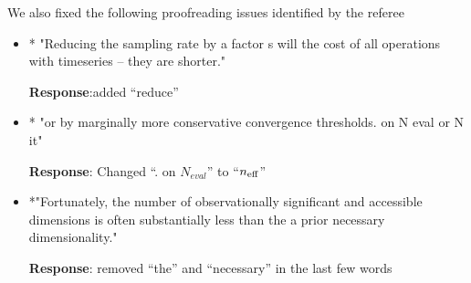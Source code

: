 \documentclass[onecolumn]{revtex4}
\begin{document}
We also fixed the following proofreading issues identified by the referee
\begin{itemize}


\item * "Reducing the sampling rate by a factor s will the cost of all
operations with timeseries – they are shorter."



\noindent \textbf{Response}:added ``reduce''


\item * "or by marginally more conservative convergence thresholds. on N
eval or N it"

\noindent \textbf{Response}: Changed ``. on $N_{eval}$'' to ``$n_{\rm eff}$''

\item *"Fortunately, the number of observationally significant and
accessible dimensions is often substantially less than the a prior
necessary dimensionality."

\noindent \textbf{Response}: removed ``the'' and ``necessary'' in the last few words

\end{itemize}
\end{document}
